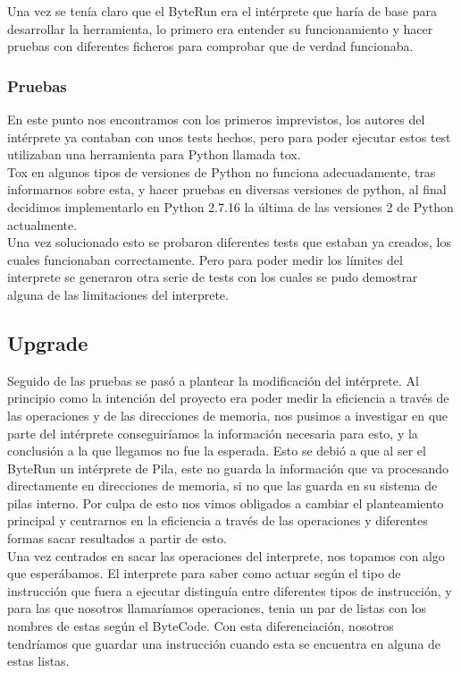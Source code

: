 	
Una vez se tenía claro que el ByteRun era el intérprete que haría de base para desarrollar la herramienta, lo primero era entender su funcionamiento y hacer pruebas con diferentes ficheros para comprobar que de verdad funcionaba.\\

\subsubsection{Pruebas}

En este punto nos encontramos con los primeros imprevistos, los autores del intérprete ya contaban con unos tests hechos, pero para poder ejecutar estos test utilizaban una herramienta para Python llamada tox.\\ 

Tox en algunos tipos de versiones de Python no funciona adecuadamente, tras informarnos sobre esta, y hacer pruebas en diversas versiones de python, al final decidimos implementarlo en Python 2.7.16 la última de las versiones 2 de Python actualmente.\\

Una vez solucionado esto se probaron diferentes tests que estaban ya creados, los cuales funcionaban correctamente. Pero para poder medir los límites del interprete se generaron otra serie de tests con los cuales se pudo demostrar alguna de las limitaciones del interprete.\\

\subsection{Upgrade}
Seguido de las pruebas se pasó a plantear la modificación del intérprete. Al principio como la intención del proyecto era poder medir la eficiencia a través de las operaciones y de las direcciones de memoria, nos pusimos a investigar en que parte del intérprete conseguiríamos la información necesaria para esto, y la conclusión a la que llegamos no fue la esperada. Esto se debió a que al ser el ByteRun un intérprete de Pila, este no guarda la información que va procesando directamente en direcciones de memoria, si no que las guarda en su sistema de pilas interno. Por culpa de esto nos vimos obligados a cambiar el planteamiento principal y centrarnos en la eficiencia a través de las operaciones y diferentes formas sacar resultados a partir de esto.\\

Una vez centrados en sacar las operaciones del interprete, nos topamos con algo que esperábamos. El interprete para saber como actuar según el tipo de instrucción que fuera a ejecutar distinguía entre diferentes tipos de instrucción, y para las que nosotros llamaríamos operaciones, tenia un par de listas con los nombres de estas según el ByteCode. Con esta diferenciación, nosotros tendríamos que guardar una instrucción cuando esta se encuentra en alguna de estas listas. \\

